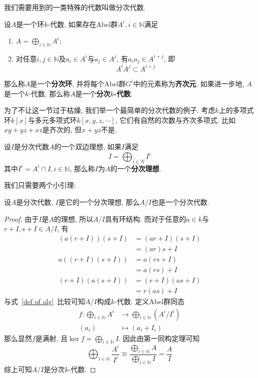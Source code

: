 我们需要用到的一类特殊的代数叫做分次代数.
\begin{defn}
    设$A$是一个环$k$-代数, 如果存在Abel群$A^i,i\in\mathbb{N}$满足
    \begin{enumerate}
        \item $\displaystyle A=\bigoplus_{i\in\mathbb{N}}A^i$;
        \item 对任意$i,j\in\mathbb{N}$及$a_i\in A^i$与$a_j\in A^j$, 有$a_ia_j\in A^{i+j}$, 即
        \[A^iA^j\subset A^{i+j}\]
    \end{enumerate}
    那么称$A$是一个\textbf{分次环}, 并将每个Abel群$G^i$中的元素称为\textbf{齐次元}.
    如果进一步地, $A$是一个$k$-代数, 那么称$A$是一个\textbf{分次$k$-代数}.
\end{defn}

\begin{eg}
    为了不让这一节过于枯燥, 我们举一个最简单的分次代数的例子.
    考虑$k$上的多项式环$k[x]$与多元多项式环$k[x,y,z,\cdots]$, 它们有自然的次数与齐次多项式.
    比如$xy+yz+xz$是齐次的, 但$x+yz$不是.
\end{eg}

\begin{defn}
    设$I$是分次代数$A$的一个双边理想, 如果$I$满足
    \[I=\bigoplus_{i\in N}I^i\]
    其中$I^i=A^i\cap I,i\in\mathbb{N}$, 那么称$I$为$A$的一个\textbf{分次理想}.
\end{defn}

我们只需要两个小引理:
\begin{lem}\label{quotient alg}
    设$A$是分次代数, $I$是它的一个分次理想, 那么$A/I$也是一个分次代数.
\end{lem}
\begin{proof}
    由于$I$是$A$的理想, 所以$A/I$具有环结构.
    而对于任意的$a\in k$与$r+I,s+I\in A/I$, 有
    \begin{align*}
        (a(r+I))(s+I)&=(ar+I)(s+I)\\
        &=(ar)s+I\\
        a((r+I)(s+I))&=a(rs+I)\\
        &=a(rs)+I\\
        (r+I)(a(s+I))&=(r+I)(as+I)\\
        &=r(as)+I
    \end{align*}
    与式~\eqref{def of alg}~比较可知$A/I$构成$k$-代数.
    定义Abel群同态
    \begin{align*}
        f:\bigoplus_{i\in\mathbb{N}}A^i&\to\bigoplus_{i\in\mathbb{N}}(A^i/I^i)\\
        (a_i)&\mapsto(a_i+I_i)
    \end{align*}
    那么显然$f$是满射, 且$\displaystyle\ker f=\bigoplus_{i\in\mathbb{N}}I$.
    因此由第一同构定理可知
    \[\bigoplus_{i\in\mathbb{N}}\frac{A^i}{I^i}\cong\frac{\bigoplus_{i\in\mathbb{N}}A}{\bigoplus_{i\in\mathbb{N}}I}=\frac{A}{I}\]
    综上可知$A/I$是分次$k$-代数.
\end{proof}

